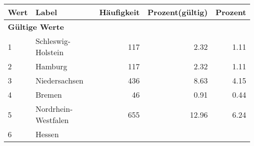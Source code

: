      \begin{longtable}{lXrrr}
     \toprule
     \textbf{Wert} & \textbf{Label} & \textbf{Häufigkeit} & \textbf{Prozent(gültig)} & \textbf{Prozent} \\
     \endhead
     \midrule
     \multicolumn{5}{l}{\textbf{Gültige Werte}}\\

     1 &
     \multicolumn{1}{X}{ Schleswig-Holstein   } &


       \num{117} &
       \num[round-mode=places,round-precision=2]{2,32} &
         \num[round-mode=places,round-precision=2]{1,11} \\

     2 &
     \multicolumn{1}{X}{ Hamburg   } &


       \num{117} &
       \num[round-mode=places,round-precision=2]{2,32} &
         \num[round-mode=places,round-precision=2]{1,11} \\

     3 &
     \multicolumn{1}{X}{ Niedersachsen   } &


       \num{436} &
       \num[round-mode=places,round-precision=2]{8,63} &
         \num[round-mode=places,round-precision=2]{4,15} \\

     4 &
     \multicolumn{1}{X}{ Bremen   } &


       \num{46} &
       \num[round-mode=places,round-precision=2]{0,91} &
         \num[round-mode=places,round-precision=2]{0,44} \\

     5 &
     \multicolumn{1}{X}{ Nordrhein-Westfalen   } &


       \num{655} &
       \num[round-mode=places,round-precision=2]{12,96} &
         \num[round-mode=places,round-precision=2]{6,24} \\

     6 &
     \multicolumn{1}{X}{ Hessen   } &



\end{longtable}
